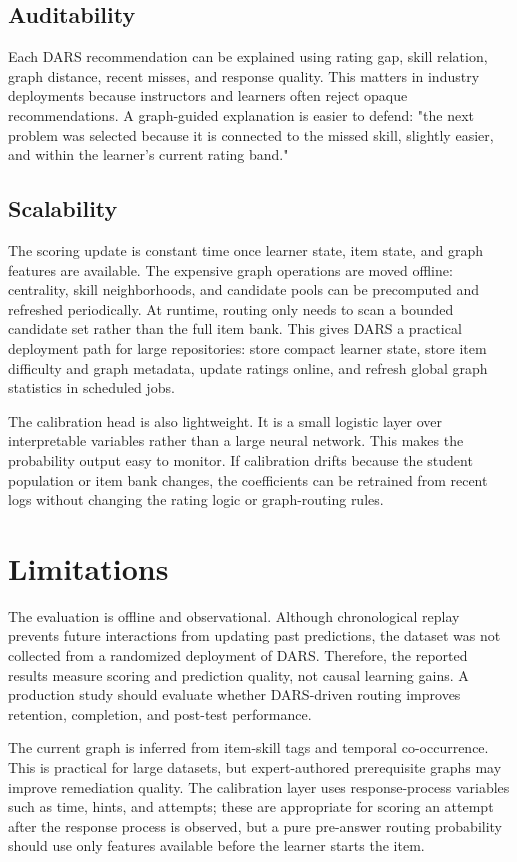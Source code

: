 \documentclass[conference]{IEEEtran}
\begin{document}
\subsection{Auditability}
Each DARS recommendation can be explained using rating gap, skill relation, graph distance, recent misses, and response quality. This matters in industry deployments because instructors and learners often reject opaque recommendations. A graph-guided explanation is easier to defend: "the next problem was selected because it is connected to the missed skill, slightly easier, and within the learner's current rating band."

\subsection{Scalability}
The scoring update is constant time once learner state, item state, and graph features are available. The expensive graph operations are moved offline: centrality, skill neighborhoods, and candidate pools can be precomputed and refreshed periodically. At runtime, routing only needs to scan a bounded candidate set rather than the full item bank. This gives DARS a practical deployment path for large repositories: store compact learner state, store item difficulty and graph metadata, update ratings online, and refresh global graph statistics in scheduled jobs.

The calibration head is also lightweight. It is a small logistic layer over interpretable variables rather than a large neural network. This makes the probability output easy to monitor. If calibration drifts because the student population or item bank changes, the coefficients can be retrained from recent logs without changing the rating logic or graph-routing rules.

\section{Limitations}
The evaluation is offline and observational. Although chronological replay prevents future interactions from updating past predictions, the dataset was not collected from a randomized deployment of DARS. Therefore, the reported results measure scoring and prediction quality, not causal learning gains. A production study should evaluate whether DARS-driven routing improves retention, completion, and post-test performance.

The current graph is inferred from item-skill tags and temporal co-occurrence. This is practical for large datasets, but expert-authored prerequisite graphs may improve remediation quality. The calibration layer uses response-process variables such as time, hints, and attempts; these are appropriate for scoring an attempt after the response process is observed, but a pure pre-answer routing probability should use only features available before the learner starts the item.
\end{document}

